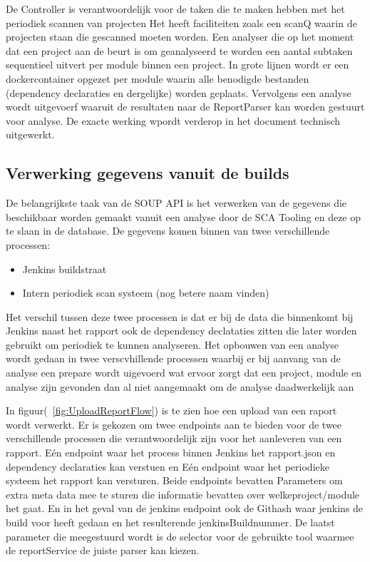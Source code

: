 De Controller is verantwoordelijk voor de taken die te maken hebben met het periodiek scannen van projecten Het heeft faciliteiten zoals een scanQ waarin de projecten staan die gescanned moeten worden. Een analyser die op het moment dat een project aan de beurt is om geanalyseerd te worden een aantal subtaken sequentieel uitvert per module binnen een project.
In grote lijnen wordt er een dockercontainer opgezet per module waarin alle benodigde bestanden (dependency declaraties en dergelijke) worden geplaats. Vervolgens een analyse wordt uitgevoerf waaruit de resultaten naar de ReportParser kan worden gestuurt voor analyse. De exacte werking wpordt verderop in het document technisch uitgewerkt.




\subsection{Verwerking gegevens vanuit de builds}\label{subsec:verwerking-gegevens-vanuit-de-sca}
De belangrijkste taak van de SOUP API is het verwerken van de gegevens die beschikbaar worden gemaakt vanuit een analyse door de SCA Tooling en deze op te slaan in de database. De gegevens komen binnen van twee verschillende processen:
\begin{itemize}
    \item Jenkins buildstraat
    \item Intern periodiek scan systeem (nog betere naam vinden)
\end{itemize}

Het verschil tussen deze twee processen is dat er bij de data die binnenkomt bij Jenkins naast het rapport ook de dependency declataties zitten die later worden gebruikt om periodiek te kunnen analyseren. Het opbouwen van een analyse wordt gedaan in twee verscvhillende processen waarbij er bij aanvang van de analyse een prepare wordt uigevoerd wat ervoor zorgt dat een project, module en analyse zijn gevonden dan al niet aangemaakt om de analyse daadwerkelijk aan



In figuur(~\ref{fig:UploadReportFlow}) is te zien hoe een upload van een raport wordt verwerkt. Er is gekozen om twee endpoints aan te bieden voor de twee verschillende processen die verantwoordelijk zijn voor het aanleveren van een rapport. Eén endpoint waar het process binnen Jenkins het rapport.json en dependency declaraties kan verstuen en Eén endpoint waar het periodieke systeem het rapport kan versturen.
Beide endpoints bevatten Parameters om extra meta data mee te sturen die informatie bevatten over welkeproject/module het gaat. En in het geval van de jenkins endpoint ook de Githash waar jenkins de build voor heeft gedaan en het resulterende jenkinsBuildnummer. De laatst parameter die meegestuurd wordt is de selector voor de gebruikte tool waarmee de reportService de juiste parser kan kiezen.

